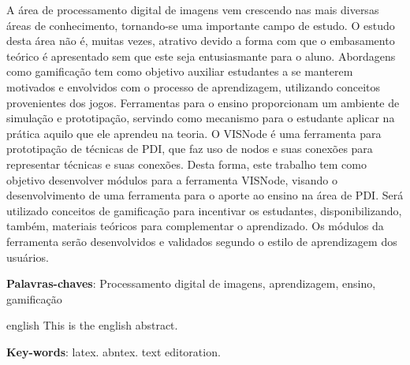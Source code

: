 \documentclass[
	12pt,				%
	oneside,			%
	a4paper,			%
	english,			%
	french,				%
	spanish,			%
	brazil,				%
	]{abntex2}
\begin{document}
\frenchspacing 


\imprimircapa
\imprimirfolhaderosto





\begin{resumo}
A área de processamento digital de imagens vem crescendo nas mais diversas áreas de conhecimento, tornando-se uma importante campo de estudo. O estudo desta área não é, muitas vezes, atrativo devido a forma com que o embasamento teórico é apresentado sem que este seja entusiasmante para o aluno. Abordagens como gamificação tem como objetivo auxiliar estudantes a se manterem motivados e envolvidos com o processo de aprendizagem, utilizando conceitos provenientes dos jogos. Ferramentas para o ensino proporcionam um ambiente de simulação e prototipação, servindo como mecanismo para o estudante aplicar na prática aquilo que ele aprendeu na teoria. O VISNode é uma ferramenta para prototipação de técnicas de PDI, que faz uso de nodos e suas conexões para representar técnicas e suas conexões. Desta forma, este trabalho tem como objetivo desenvolver módulos para a ferramenta VISNode, visando o desenvolvimento de uma ferramenta para o aporte ao ensino na área de PDI. Será utilizado conceitos de gamificação para incentivar os estudantes, disponibilizando, também, materiais teóricos para complementar o aprendizado. Os módulos da ferramenta serão desenvolvidos e validados segundo o estilo de aprendizagem dos usuários.

 \vspace{\onelineskip}
    
 \noindent
 \textbf{Palavras-chaves}: Processamento digital de imagens, aprendizagem, ensino, gamificação
\end{resumo}

\begin{resumo}[Abstract]
 \begin{otherlanguage*}{english}
   This is the english abstract.

   \vspace{\onelineskip}
 
   \noindent 
   \textbf{Key-words}: latex. abntex. text editoration.
 \end{otherlanguage*}
\end{resumo}
\end{document}

